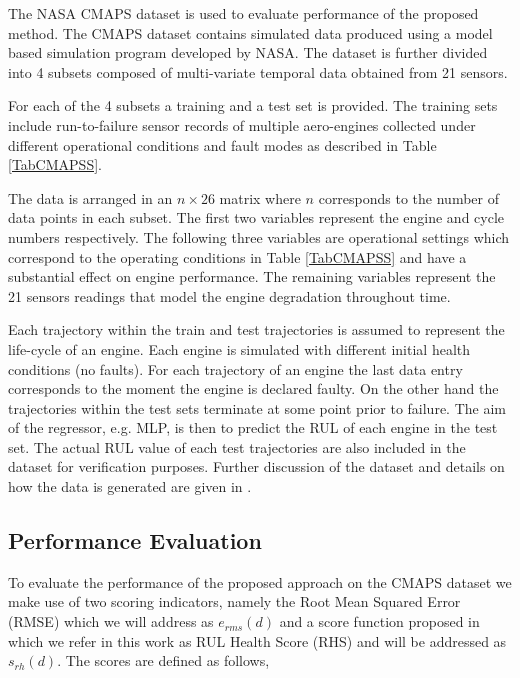 \documentclass[12pt]{IEEEtran}%
\begin{document}
\label{sec:rul_dataset}

The NASA CMAPS dataset \cite{CMAPS2008} is used to evaluate performance of the
proposed method. The CMAPS dataset contains simulated data produced using a
model based simulation program developed by NASA. The dataset is further
divided into 4 subsets composed of multi-variate temporal data obtained from
21 sensors.

For each of the 4 subsets a training and a test set is provided. The training
sets include run-to-failure sensor records of multiple aero-engines collected
under different operational conditions and fault modes as described in Table
\ref{TabCMAPSS}.


The data is arranged in an $n\times26$ matrix where $n$ corresponds to the
number of data points in each subset. The first two variables represent the
engine and cycle numbers respectively. The following three variables are
operational settings which correspond to the operating conditions in Table
\ref{TabCMAPSS} and have a substantial effect on engine performance. The
remaining variables represent the 21 sensors readings that model the engine
degradation throughout time.

Each trajectory within the train and test trajectories is assumed to represent
the life-cycle of an engine. Each engine is simulated with different initial
health conditions (no faults). For each trajectory of an engine the last data
entry corresponds to the moment the engine is declared faulty. On the other
hand the trajectories within the test sets terminate at some point prior to
failure. The aim of the regressor, e.g. MLP, is then to predict the RUL of
each engine in the test set. The actual RUL value of each test trajectories
are also included in the dataset for verification purposes. Further discussion
of the dataset and details on how the data is generated are given in
\cite{Saxena2008}.

\subsection{Performance Evaluation}

\label{sec:rul_metrics}

To evaluate the performance of the proposed approach on the CMAPS dataset we
make use of two scoring indicators, namely the Root Mean Squared Error (RMSE)
which we will address as $e_{rms}(d)$ and a score function proposed in
\cite{Saxena2008} which we refer in this work as RUL Health Score (RHS) and
will be addressed as $s_{rh}(d)$. The scores are defined as follows,%
\end{document}
